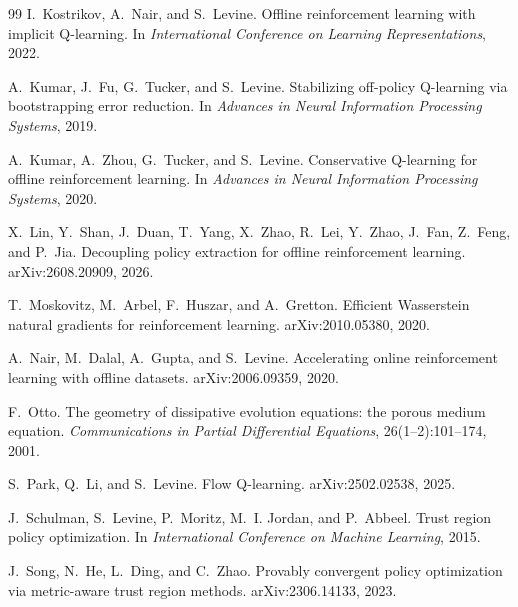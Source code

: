 \begin{thebibliography}{99}
I.~Kostrikov, A.~Nair, and S.~Levine.
\newblock Offline reinforcement learning with implicit Q-learning.
\newblock In \emph{International Conference on Learning Representations}, 2022.

A.~Kumar, J.~Fu, G.~Tucker, and S.~Levine.
\newblock Stabilizing off-policy Q-learning via bootstrapping error reduction.
\newblock In \emph{Advances in Neural Information Processing Systems}, 2019.

A.~Kumar, A.~Zhou, G.~Tucker, and S.~Levine.
\newblock Conservative Q-learning for offline reinforcement learning.
\newblock In \emph{Advances in Neural Information Processing Systems}, 2020.

X.~Lin, Y.~Shan, J.~Duan, T.~Yang, X.~Zhao, R.~Lei, Y.~Zhao, J.~Fan, Z.~Feng, and P.~Jia.
\newblock Decoupling policy extraction for offline reinforcement learning.
\newblock arXiv:2608.20909, 2026.

T.~Moskovitz, M.~Arbel, F.~Huszar, and A.~Gretton.
\newblock Efficient Wasserstein natural gradients for reinforcement learning.
\newblock arXiv:2010.05380, 2020.

A.~Nair, M.~Dalal, A.~Gupta, and S.~Levine.
\newblock Accelerating online reinforcement learning with offline datasets.
\newblock arXiv:2006.09359, 2020.

F.~Otto.
\newblock The geometry of dissipative evolution equations: the porous medium equation.
\newblock \emph{Communications in Partial Differential Equations}, 26(1--2):101--174, 2001.

S.~Park, Q.~Li, and S.~Levine.
\newblock Flow Q-learning.
\newblock arXiv:2502.02538, 2025.

J.~Schulman, S.~Levine, P.~Moritz, M.~I. Jordan, and P.~Abbeel.
\newblock Trust region policy optimization.
\newblock In \emph{International Conference on Machine Learning}, 2015.

J.~Song, N.~He, L.~Ding, and C.~Zhao.
\newblock Provably convergent policy optimization via metric-aware trust region methods.
\newblock arXiv:2306.14133, 2023.


\end{thebibliography}
